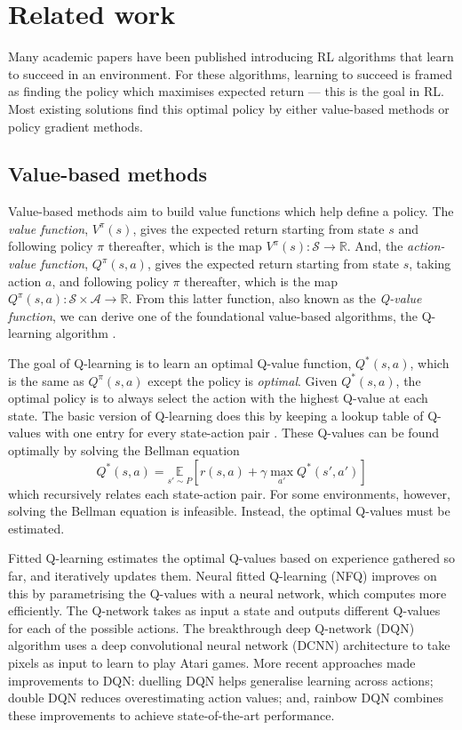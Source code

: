 \documentclass[12pt,a4paper]{article}
\begin{document}
\newpage
\section{Related work}
\label{section:related-work}
Many academic papers have been published introducing RL algorithms that learn to succeed in an environment. For these algorithms, learning to succeed is framed as finding the policy which maximises expected return --- this is the goal in RL. Most existing solutions find this optimal policy by either value-based methods or policy gradient methods. 

\subsection{Value-based methods}
Value-based methods aim to build value functions which help define a policy. The \emph{value function}, $V^{\pi}(s)$, gives the expected return starting from state $s$ and following policy $\pi$ thereafter, which is the map $V^{\pi}(s): \mathcal{S} \rightarrow \mathbb{R}$. And, the \emph{action-value function}, $Q^{\pi}(s,a)$, gives the expected return starting from state $s$, taking action $a$, and following policy $\pi$ thereafter, which is the map $Q^{\pi}(s,a): \mathcal{S} \times \mathcal{A} \rightarrow \mathbb{R}$. From this latter function, also known as the \emph{Q-value function}, we can derive one of the foundational value-based algorithms, the Q-learning algorithm \cite{Watkins1992}.

The goal of Q-learning is to learn an optimal Q-value function, $Q^*(s,a)$, which is the same as $Q^{\pi}(s,a)$ except the policy is \emph{optimal}. Given $Q^*(s,a)$, the optimal policy is to always select the action with the highest Q-value at each state. The basic version of Q-learning does this by keeping a lookup table of Q-values with one entry for every state-action pair \cite{DBLP:journals/corr/abs-1811-12560}. These Q-values can be found optimally by solving the Bellman equation \cite{R-352-PR} $$Q^*(s,a) = \underset{s'\sim P}{\mathbb{E}} \left[{r(s,a) + \gamma \underset{a'}{\max} Q^*(s',a')}\right]$$ which recursively relates each state-action pair. For some environments, however, solving the Bellman equation is infeasible. Instead, the optimal Q-values must be estimated.

Fitted Q-learning \cite{10.5555/2998828.2998976} estimates the optimal Q-values based on experience gathered so far, and iteratively updates them. Neural fitted Q-learning (NFQ) \cite{10.1007/11564096_32} improves on this by parametrising the Q-values with a neural network, which computes more efficiently. The Q-network takes as input a state and outputs different Q-values for each of the possible actions. The breakthrough deep Q-network (DQN) algorithm \cite{Mnih2015} uses a deep convolutional neural network (DCNN) architecture to take pixels as input to learn to play Atari games. More recent approaches made improvements to DQN: duelling DQN \cite{DBLP:journals/corr/WangFL15} helps generalise learning across actions; double DQN \cite{DBLP:journals/corr/HasseltGS15} reduces overestimating action values; and, rainbow DQN \cite{DBLP:journals/corr/abs-1710-02298} combines these improvements to achieve state-of-the-art performance.
\end{document}
